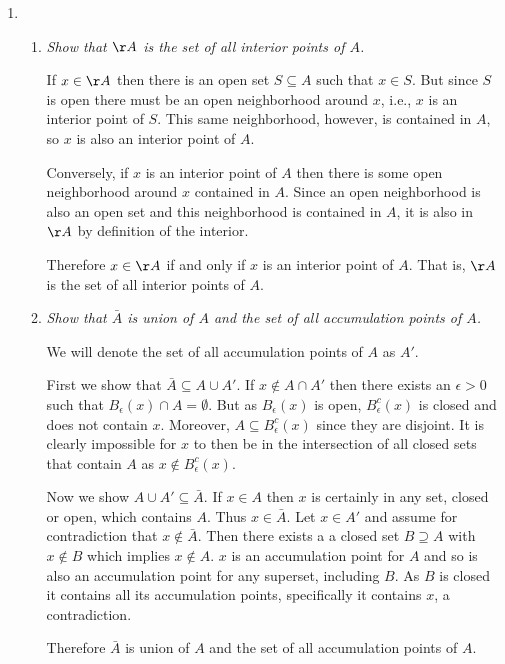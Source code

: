 \documentclass[11pt]{article}
\begin{document}
\begin{enumerate}
\item
\begin{enumerate}
\item \emph{Show that $\AA$ is the set of all interior points of $A$.}

If $x \in \AA$ then there is an open set $S \subseteq A$ such that $x \in S$.  But since $S$ is open there must be an open neighborhood around $x$, i.e., $x$ is an interior point of $S$.  This same neighborhood, however, is contained in $A$, so $x$ is also an interior point of $A$.

Conversely, if $x$ is an interior point of $A$ then there is some open neighborhood around $x$ contained in $A$.  Since an open neighborhood is also an open set and this neighborhood is contained in $A$, it is also in $\AA$ by definition of the interior.

Therefore $x \in \AA$ if and only if $x$ is an interior point of $A$.  That is, $\AA$ is the set of all interior points of $A$.
\item \emph{Show that $\bar{A}$ is union of $A$ and the set of all accumulation points of $A$.}

We will denote the set of all accumulation points of $A$ as $A'$.

First we show that $\bar{A} \subseteq A \cup A'$.  If $x \notin A \cap A'$ then there exists an $\epsilon>0$ such that $B_\epsilon(x) \cap A = \emptyset$.  But as $B_\epsilon(x)$ is open, $B_\epsilon^c(x)$ is closed and does not contain $x$.  Moreover, $A \subseteq B_\epsilon^c(x)$ since they are disjoint.  It is clearly impossible for $x$ to then be in the intersection of all closed sets that contain $A$ as $x \notin B_\epsilon^c(x)$.

Now we show $A \cup A' \subseteq \bar{A}$.  If $x \in A$ then $x$ is certainly in any set, closed or open, which contains $A$.  Thus $x \in \bar{A}$.  Let $x \in A'$ and assume for contradiction that $x \notin \bar{A}$.  Then there exists a a closed set $B \supseteq A$ with $x \notin B$ which implies $x \notin A$.  $x$ is an accumulation point for $A$ and so is also an accumulation point for any superset, including $B$.  As $B$ is closed it contains all its accumulation points, specifically it contains $x$, a contradiction.

Therefore $\bar{A}$ is union of $A$ and the set of all accumulation points of $A$.
\end{enumerate}
\end{enumerate}
\end{document}
